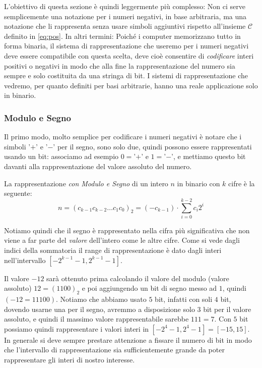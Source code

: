 L'obiettivo di questa sezione è quindi leggermente più complesso: Non ci serve semplicemente una notazione per i numeri negativi, in base arbitraria, ma una notazione che li rappresenta senza usare simboli aggiuntivi rispetto all'insieme $\mathcal{C}$ definito in \eqref{eq:pos}. In altri termini: Poiché i computer memorizzano tutto in forma binaria, il sistema di rappresentazione che useremo per i numeri negativi deve essere compatibile con questa scelta, deve cioè consentire di \emph{codificare} interi positivi o negativi in modo che alla fine la rappresentazione del numero sia sempre e solo costituita da una stringa di bit. I sistemi di rappresentazione che vedremo, per quanto
definiti per basi arbitrarie, hanno una reale applicazione solo in binario.

\subsubsection{Modulo e Segno}

Il primo modo, molto semplice per codificare i numeri negativi è notare che i
simboli '$+$' e '$-$' per il segno, sono solo due, quindi possono essere
rappresentati usando un bit: associamo ad esempio $0 = $'$+$' e $1 = $'$-$', e
mettiamo questo bit davanti alla rappresentazione del valore assoluto del
numero.

\begin{defn} La rappresentazione \emph{con Modulo e
Segno} di un intero $n$ in binario con $k$ cifre è la seguente:
\[ n = (c_{k-1}c_{k-2}{\ldots}c_1c_0)_2 = (-c_{k-1}) \cdot \sum_{i=0}^{k-2}c_i2^i \]
\end{defn}

Notiamo quindi che il segno è rappresentato nella cifra più significativa che  non viene a far parte del \emph{valore} dell'intero come le altre cifre. Come si vede dagli indici della sommatoria il range di rappresentazione è dato dagli interi nell'intervallo $[-2^{k-1}-1,2^{k-1}-1]$.

\begin{ex} Il valore $-12$ sarà ottenuto prima calcolando il valore del modulo
(valore assoluto) $12 = (1100)_2$ e poi aggiungendo un bit di segno messo ad
$1$, quindi $(-12 = 11100)$. Notiamo che abbiamo usato $5$ bit, infatti con
soli $4$ bit, dovendo usarne una per il segno, avremmo a disposizione solo $3$
bit per il valore assoluto, e quindi il massimo valore rappresentabile sarebbe
$111 = 7$. Con $5$ bit possiamo quindi rappresentare i valori interi in
$[-2^4-1,2^4-1] = [-15,15]$. In generale si deve sempre prestare attenzione a
fissare il numero di bit in modo che l'intervallo di rappresentazione sia
sufficientemente grande da poter rappresentare gli interi di nostro interesse.
\end{ex}

